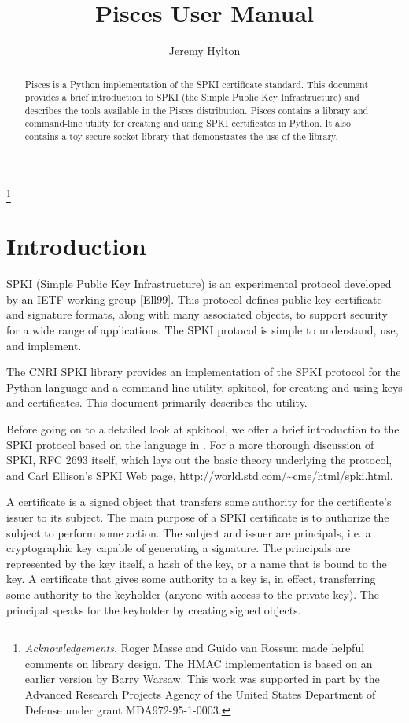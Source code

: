\documentclass{howto}
\title{Pisces User Manual}
\author{Jeremy Hylton}
\begin{document}
\maketitle

\begin{abstract}
\noindent
Pisces is a Python implementation of the SPKI certificate standard.
This document provides a brief introduction to SPKI (the Simple Public
Key Infrastructure) and describes the tools available in the Pisces
distribution.  Pisces contains a library and command-line utility for
creating and using SPKI certificates in Python.  It also contains a
toy secure socket library that demonstrates the use of the library.
\end{abstract}

\tableofcontents

\thanks{\emph{Acknowledgements.} Roger Masse and Guido van Rossum made
helpful comments on library design.  The {HMAC} implementation is
based on an earlier version by Barry Warsaw. This work was supported
in part by the Advanced Research Projects Agency of the United States
Department of Defense under grant MDA972-95-1-0003.}

\section{Introduction}

SPKI (Simple Public Key Infrastructure) is an experimental protocol
developed by an IETF working group [Ell99].  This protocol defines
public key certificate and signature formats, along with many
associated objects, to support security for a wide range of
applications.  The SPKI protocol is simple to understand, use, and
implement.

The CNRI SPKI library provides an implementation of the SPKI protocol
for the Python language and a command-line utility, spkitool, for
creating and using keys and certificates.  This document primarily
describes the utility.

Before going on to a detailed look at spkitool, we offer a brief
introduction to the SPKI protocol based on the language in 
\cite{ellison99-theory}.  For a more thorough discussion of SPKI, RFC
2693 itself, which lays out the basic theory underlying the protocol,
and Carl Ellison's SPKI Web page,
\url{http://world.std.com/~cme/html/spki.html}.

A certificate is a signed object that transfers some authority for the
certificate's issuer to its subject.  The main purpose of a SPKI
certificate is to authorize the subject to perform some action.  The
subject and issuer are principals, i.e. a cryptographic key capable of
generating a signature.  The principals are represented by the key
itself, a hash of the key, or a name that is bound to the key.  A
certificate that gives some authority to a key is, in effect,
transferring some authority to the keyholder (anyone with access to
the private key).  The principal speaks for the keyholder by creating
signed objects.
\end{document}
